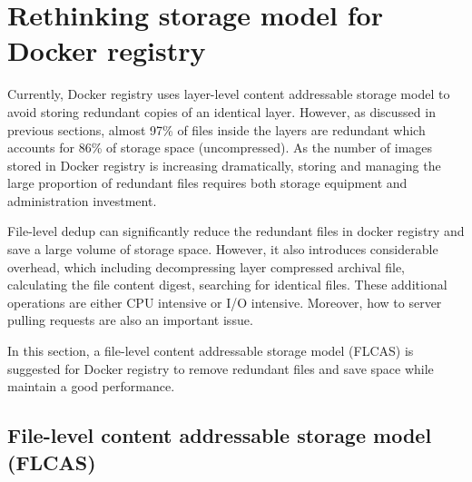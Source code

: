 \section{Rethinking storage model for Docker registry}
\label{sec:file_adressable}

Currently, Docker registry uses layer-level content addressable storage model to avoid storing redundant copies of an identical layer. 
However, as discussed in previous sections, almost 97\% of files inside the layers are redundant which accounts for 86\% of storage space (uncompressed). 
As the number of images stored in Docker registry is increasing dramatically, 
storing and managing the large proportion of redundant files requires both storage equipment and administration investment. 

File-level dedup can significantly reduce the redundant files in docker registry and save a large volume of storage space.
However, it also introduces considerable overhead, which including decompressing layer compressed archival file, calculating the file content digest, searching for identical files. These additional operations are either CPU intensive or I/O intensive. Moreover, how to server pulling requests are also an important issue. 

In this section, a file-level content addressable storage model (FLCAS) is suggested for Docker registry to remove redundant files and save space while maintain a good performance.
%

\subsection{File-level content addressable storage model (FLCAS)}
\label{subsec:FLCAS}

